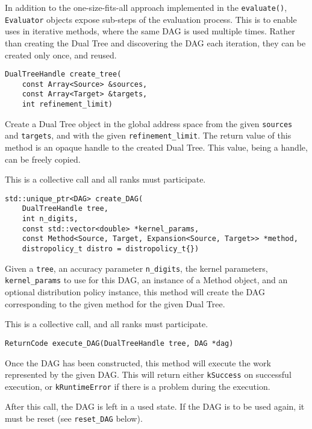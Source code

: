 In addition to the one-size-fits-all approach implemented in the
\texttt{evaluate()}, \texttt{Evaluator} objects expose sub-steps of the
evaluation process. This is to enable uses in iterative methods, where the
same DAG is used multiple times. Rather than creating the Dual Tree and
discovering the DAG each iteration, they can be created only once, and
reused.

\begin{lstlisting}
DualTreeHandle create_tree(
    const Array<Source> &sources,
    const Array<Target> &targets,
    int refinement_limit)
\end{lstlisting}

\noindent Create a Dual Tree object in the global address space from the
given \texttt{sources} and \texttt{targets}, and with the given
\texttt{refinement\_limit}. The return value of this method is an opaque
handle to the created Dual Tree. This value, being a handle, can be freely
copied.

This is a collective call and all ranks must participate.

\begin{lstlisting}
std::unique_ptr<DAG> create_DAG(
    DualTreeHandle tree,
    int n_digits,
    const std::vector<double> *kernel_params,
    const Method<Source, Target, Expansion<Source, Target>> *method,
    distropolicy_t distro = distropolicy_t{})
\end{lstlisting}

\noindent Given a \texttt{tree}, an accuracy parameter \texttt{n\_digits},
the kernel
parameters, \texttt{kernel\_params} to use for this DAG, an instance of a
Method object, and an optional distribution policy instance, this method will
create the DAG corresponding to the given method for the given Dual Tree.

This is a collective call, and all ranks must participate.

\begin{lstlisting}
ReturnCode execute_DAG(DualTreeHandle tree, DAG *dag)
\end{lstlisting}

\noindent Once the DAG has been constructed, this method will execute the work
represented by the given DAG. This will return either \texttt{kSuccess} on
successful execution, or \texttt{kRuntimeError} if there is a problem during
the execution.

After this call, the DAG is left in a used state. If the DAG is to be used
again, it must be reset (see \texttt{reset\_DAG} below).

